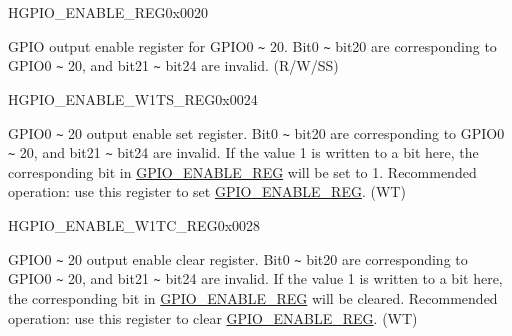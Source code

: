 \begin{register}{H}{GPIO\_ENABLE\_REG}{0x0020}\label{regdesc:GPIOENABLEREG}
%
%
\regnewline%
\begin{regdesc}\begin{reglist}
\label{fielddesc:GPIOENABLEDATA}\item [GPIO\_ENABLE\_DATA] GPIO output enable register for GPIO0 \verb+~+ 20. Bit0 \verb+~+ bit20 are corresponding to GPIO0 \verb+~+ 20, and bit21 \verb+~+ bit24 are invalid. (R/W/SS)
\end{reglist}\end{regdesc}
\end{register}


\begin{register}{H}{GPIO\_ENABLE\_W1TS\_REG}{0x0024}\label{regdesc:GPIOENABLEW1TSREG}
%
%
\regnewline%
\begin{regdesc}\begin{reglist}
\label{fielddesc:GPIOENABLEW1TS}\item [GPIO\_ENABLE\_W1TS] GPIO0 \verb+~+ 20 output enable set register. Bit0 \verb+~+ bit20 are corresponding to GPIO0 \verb+~+ 20, and bit21 \verb+~+ bit24 are invalid. If the value 1 is written to a bit here, the corresponding bit in \hyperref[regdesc:GPIOENABLEREG]{GPIO\_ENABLE\_REG} will be set to 1. Recommended operation: use this register to set \hyperref[regdesc:GPIOENABLEREG]{GPIO\_ENABLE\_REG}. (WT)
\end{reglist}\end{regdesc}
\end{register}


\begin{register}{H}{GPIO\_ENABLE\_W1TC\_REG}{0x0028}\label{regdesc:GPIOENABLEW1TCREG}
%
%
\regnewline%
\begin{regdesc}\begin{reglist}
\label{fielddesc:GPIOENABLEW1TC}\item [GPIO\_ENABLE\_W1TC] GPIO0 \verb+~+ 20 output enable clear register. Bit0 \verb+~+ bit20 are corresponding to GPIO0 \verb+~+ 20, and bit21 \verb+~+ bit24 are invalid. If the value 1 is written to a bit here, the corresponding bit in \hyperref[regdesc:GPIOENABLEREG]{GPIO\_ENABLE\_REG} will be cleared. Recommended operation: use this register to clear \hyperref[regdesc:GPIOENABLEREG]{GPIO\_ENABLE\_REG}. (WT)
\end{reglist}\end{regdesc}
\end{register}


